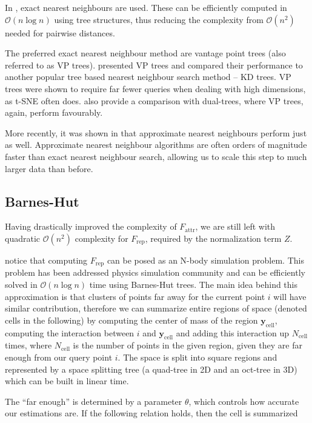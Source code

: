 \documentclass[11pt]{article}
\begin{document}
In \cite{van2014accelerating}, exact nearest neighbours are used. These can be efficiently computed in $\mathcal{O}(n \log n)$ using tree structures, thus reducing the complexity from $\mathcal{O}(n^2)$ needed for pairwise distances.

The preferred exact nearest neighbour method are vantage point trees (also referred to as VP trees). \cite{yianilos1993data} presented VP trees and compared their performance to another popular tree based nearest neighbour search method -- KD trees. VP trees were shown to require far fewer queries when dealing with high dimensions, as t-SNE often does.\cite{van2014accelerating} also provide a comparison with dual-trees, where VP trees, again, perform favourably.

More recently, it was shown in \cite{linderman2017efficient} that approximate nearest neighbours perform just as well. Approximate nearest neighbour algorithms are often orders of magnitude faster than exact nearest neighbour search, allowing us to scale this step to much larger data than before.

\subsection{Barnes-Hut}

Having drastically improved the complexity of $F_\text{attr}$, we are still left with quadratic $\mathcal{O}(n^2)$ complexity for $F_\text{rep}$, required by the normalization term $Z$.

\cite{van2014accelerating} notice that computing $F_\text{rep}$ can be posed as an N-body simulation problem. This problem has been addressed physics simulation community and can be efficiently solved in $\mathcal{O}(n \log n)$ time using Barnes-Hut trees. The main idea behind this approximation is that clusters of points far away for the current point $i$ will have similar contribution, therefore we can summarize entire regions of space (denoted cells in the following) by computing the center of mass of the region $\mathbf{y}_{\text{cell}}$, computing the interaction between $i$ and $\mathbf{y}_{\text{cell}}$ and adding this interaction up $N_{\text{cell}}$ times, where $N_{\text{cell}}$ is the number of points in the given region, given they are far enough from our query point $i$. The space is split into square regions and represented by a space splitting tree (a quad-tree in 2D and an oct-tree in 3D) which can be built in linear time.

The ``far enough'' is determined by a parameter $\theta$, which controls how accurate our estimations are. If the following relation holds, then the cell is summarized
\end{document}
